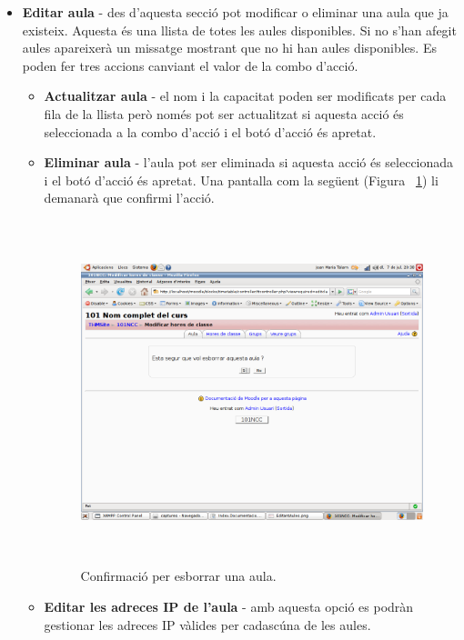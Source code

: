 \documentclass[a4paper]{report}  %
\begin{document}
\begin{itemize}
\item\textbf{Editar aula} - des d'aquesta secció pot modificar o eliminar una aula que ja existeix.
Aquesta és una llista de totes les aules disponibles. Si no s'han afegit aules apareixerà un missatge mostrant que no hi han aules disponibles.
Es poden fer tres accions canviant el valor de la combo d'acció.
	\begin{itemize}
	\item\textbf{Actualitzar aula} - el nom i la capacitat poden ser modificats per cada fila de la llista però només pot ser actualitzat si aquesta acció és seleccionada a la combo d'acció i el botó d'acció és apretat.
	\item\textbf{Eliminar aula} - l'aula pot ser eliminada si aquesta acció és seleccionada i el botó d'acció és apretat. Una pantalla com la següent (Figura ~\ref{fig:EsborrarAula}) li demanarà que confirmi l'acció.
		\begin{figure}[H] %
		\begin{center}
		\includegraphics[height=10cm,width=12cm]{img/EsborrarAula.png}
		\caption[List caption]{Confirmació per esborrar una aula.}
		\label{fig:EsborrarAula}
		\end{center}
		\end{figure}
	\item\textbf{Editar les adreces IP de l'aula} - amb aquesta opció es podràn gestionar les adreces IP vàlides per cadascúna de les aules.
	\end{itemize}
	

\end{itemize}
\end{document}
